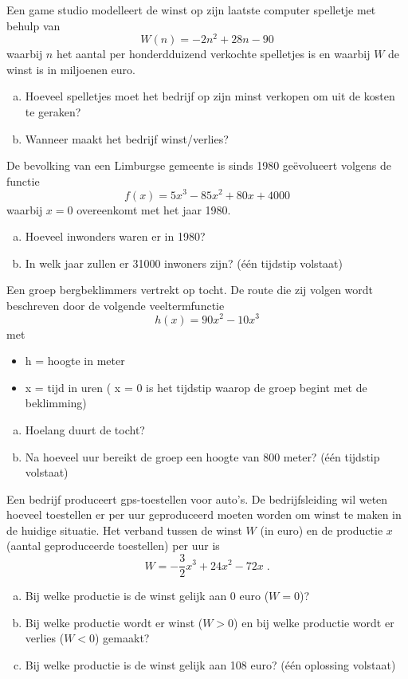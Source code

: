 \documentclass[12pt]{article}
\begin{document}
\begin{oefening}
Een game studio modelleert de winst op zijn laatste computer spelletje met behulp van
$$W(n)=-2n^2+28n-90$$ waarbij $n$ het aantal per honderdduizend verkochte spelletjes is en waarbij $W$ de winst is in miljoenen euro.
\begin{enumerate}[(a)]
  \item Hoeveel spelletjes moet het bedrijf op zijn minst verkopen om uit de kosten te geraken?
  \item Wanneer maakt het bedrijf winst/verlies?
\end{enumerate}
\end{oefening}

\begin{oefening}
De bevolking van een Limburgse gemeente is sinds 1980 geëvolueert volgens de functie $$f(x)=5x^3-85x^2+80x+4000$$ waarbij $x=0$ overeenkomt met het jaar 1980.
\begin{enumerate}[(a)]
  \item Hoeveel inwonders waren er in 1980?
  \item In welk jaar zullen er 31000 inwoners zijn? (één tijdstip volstaat)
\end{enumerate}
\end{oefening}

\begin{oefening}
Een groep bergbeklimmers vertrekt op tocht.  De route die zij volgen wordt beschreven	door de volgende veeltermfunctie $$h(x)=90x^2-10x^3$$ met
\begin{itemize}
  \item h = hoogte in meter
  \item x = tijd in uren ( x = 0 is het tijdstip waarop de groep begint met de beklimming)
\end{itemize}
\begin{enumerate}[(a)]
  \item Hoelang duurt de tocht?
  \item Na hoeveel uur bereikt de groep een hoogte van 800 meter? (één tijdstip volstaat)
\end{enumerate}
\end{oefening}

\begin{oefening}
Een bedrijf produceert gps-toestellen voor auto’s.  De bedrijfsleiding wil weten hoeveel toestellen er per uur geproduceerd moeten worden om winst te maken in de huidige situatie.  Het verband tussen de winst $W$ (in euro) en de productie $x$ (aantal geproduceerde toestellen) per uur is
$$W=-\dfrac{3}{2}x^3+24x^2-72x\;.$$
\begin{enumerate}[(a)]
  \item Bij welke productie is de winst gelijk aan 0 euro ($W = 0$)?
  \item Bij welke productie wordt er winst ($W > 0$) en bij welke productie wordt er verlies ($W < 0$) gemaakt?
  \item Bij welke productie is de winst gelijk aan 108 euro?  (één oplossing volstaat)
\end{enumerate}
\end{oefening}
\end{document}
